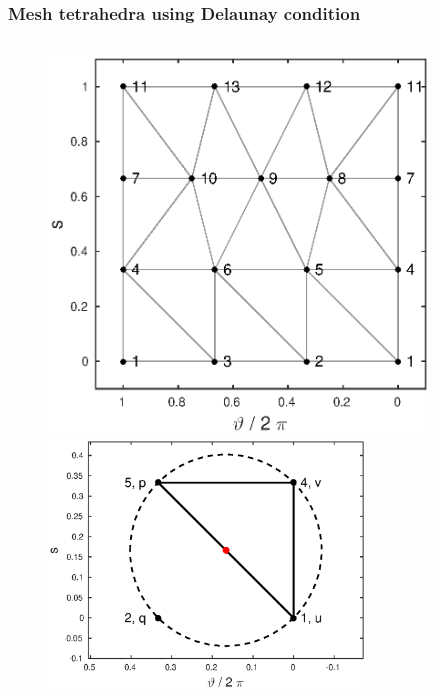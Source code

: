 \documentclass{beamer}
\begin{document}
\begin{frame}
\frametitle{Mesh tetrahedra using Delaunay condition}
\vspace{-1.5cm}
\begin{columns}[onlytextwidth]
	\begin{column}{0.5\textwidth}
		\begin{center}
			\begin{figure}
				\includegraphics[trim={0cm 0cm 0cm 0cm},clip,width=0.9\textwidth]{FIGURES/Delaunay_Connected_PrismFaces.eps}
	\includegraphics[trim={0cm 0cm 0cm 0cm},clip,width=0.75\textwidth]{FIGURES/uvpq_Delaunay.eps}
			\end{figure}
		\end{center}
	\end{column}

\end{columns}
\end{frame}
\end{document}
